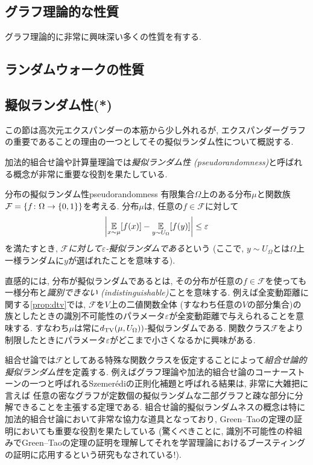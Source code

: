 \subsection{グラフ理論的な性質}
グラフ理論的に非常に興味深い多くの性質を有する.

\subsection{ランダムウォークの性質}

\subsection{擬似ランダム性(*)} \label{sec:expander pseudorandom}
この節は高次元エクスパンダーの本筋から少し外れるが,
エクスパンダーグラフの重要であることの理由の一つとしてその擬似ランダム性について概説する.

加法的組合せ論や計算量理論では\emph{擬似ランダム性 (pseudorandomness)}と呼ばれる概念が非常に重要な役割を果たしている.
\begin{definition}{分布の擬似ランダム性}{pseudorandomness}
    有限集合$\Omega$上のある分布$\mu$と関数族$\mathcal{F}=\{f\colon \Omega \to \{0,1\}\}$を考える.
    分布$\mu$は,
    任意の$f\in \mathcal{F}$に対して
    \[ \left\lvert\operatorname*{\mathbb{E}}_{x\sim \mu} [f(x)] - \operatorname*{\mathbb{E}}_{y\sim U_{\Omega}}[f(y)]\right\rvert \le \varepsilon\]
    を満たすとき, \emph{$\mathcal{F}$に対して$\varepsilon$-擬似ランダムである}という (ここで, $y\sim U_\Omega$とは$\Omega$上一様ランダムに$y$が選ばれたことを意味する).
\end{definition}
直感的には, 分布が擬似ランダムであるとは, その分布が任意の$f\in \mathcal{F}$を使っても一様分布と\emph{識別できない (indistinguishable)}ことを意味する.
例えば全変動距離に関する\cref{prop:dtv}では, $\mathcal{F}$を$V$上の二値関数全体 (すなわち任意の$V$の部分集合)の族としたときの識別不可能性のパラメータ$\varepsilon$が全変動距離で与えられることを意味する.
すなわち$\mu$は常に$d_{\mathrm{TV}}(\mu,U_{\Omega}))$-擬似ランダムである.
関数クラス$\mathcal{F}$をより制限したときにパラメータ$\varepsilon$がどこまで小さくなるかに興味がある.

組合せ論では$\mathcal{F}$としてある特殊な関数クラスを仮定することによって\emph{組合せ論的擬似ランダム性}を定義する.
例えばグラフ理論や加法的組合せ論のコーナーストーンの一つと呼ばれるSzemerédiの正則化補題と呼ばれる結果は, 非常に大雑把に言えば
任意の密なグラフが定数個の擬似ランダムな二部グラフと疎な部分に分解できることを主張する定理である.
組合せ論的擬似ランダムネスの概念は特に加法的組合せ論において非常な協力な道具となっており,
Green--Taoの定理の証明においても重要な役割を果たしている
(驚くべきことに, 識別不可能性の枠組みでGreen--Taoの定理の証明を理解してそれを学習理論におけるブースティングの証明に応用するという研究もなされている!).

